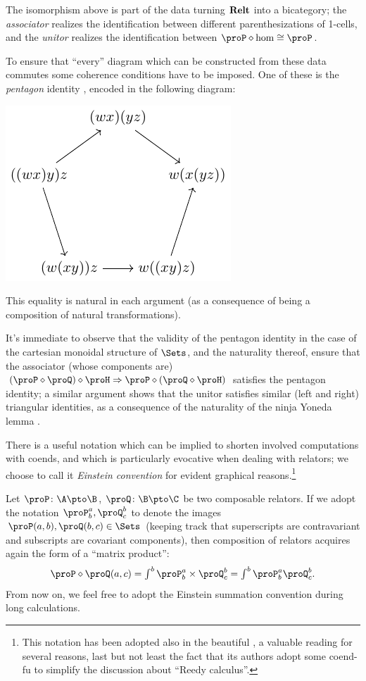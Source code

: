 \begin{remark}\label{isitpentagon}
The isomorphism above is part of the data turning $\textbf{Relt}$ into a bicategory; the \emph{associator} realizes the identification between different parenthesizations of 1-cells, and the \emph{unitor} realizes the identification between $\proP\diamond \hom\cong \proP$.

To ensure that ``every'' diagram which can be constructed from these data commutes some coherence conditions have to be imposed. One of these is the \emph{pentagon} identity \cite{McL}, encoded in the following diagram:
\begin{center}
\includegraphics[scale=1]{figures/fig22}
\end{center}
This equality is natural in each argument (as a consequence of being a composition of natural transformations). 

It's immediate to observe that the validity of the pentagon identity in the case of the cartesian monoidal structure of $\Sets$, and the naturality thereof, ensure that the associator (whose components are) $(\proP\diamond\proQ)\diamond\proH \Rightarrow \proP\diamond(\proQ\diamond\proH)$ satisfies the pentagon identity; a similar argument shows that the unitor satisfies similar (left and right) triangular identities, as a consequence of the naturality of the ninja Yoneda lemma .
\end{remark}
\begin{definition}\label{einstein}
There is a useful notation which can be implied to shorten involved computations with coends, and which is particularly evocative when dealing with relators; we choose to call it \emph{Einstein convention} for evident graphical reasons.\footnote{This notation has been adopted also in the beautiful \cite{emilyreedy}, a valuable reading for several reasons, last but not least the fact that its authors adopt some coend-fu to simplify the discussion about ``Reedy calculus''.}

Let $\proP\colon \A\pto \B$, $\proQ\colon \B\pto\C$ be two composable relators. If we adopt the notation $\proP^a_b, \proQ^b_c$ to denote the images $\proP(a,b), \proQ(b,c)\in\Sets$ (keeping track that superscripts are contravariant and subscripts are covariant components), then composition of relators acquires again the form of a ``matrix product'':
\[\textstyle 
\proP\diamond \proQ(a,c) = \int^b \proP^a_b\times \proQ^b_c = \int^b \proP^a_b \proQ^b_c.
\]
From now on, we feel free to adopt the Einstein summation convention during long calculations.
\end{definition}

